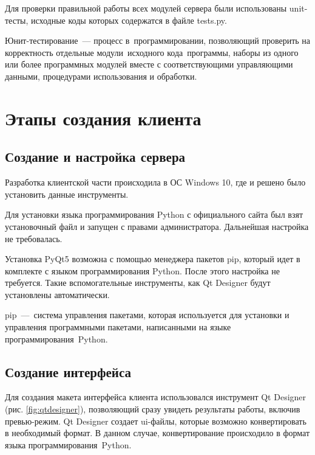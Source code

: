 Для проверки правильной работы всех модулей сервера были использованы unit-тесты, исходные коды которых содержатся в файле tests.py.
\begin{definition}
    Юнит-тестирование --- процесс в программировании, позволяющий проверить на корректность отдельные модули исходного кода программы,
    наборы из одного или более программных модулей вместе с соответствующими управляющими данными, процедурами использования и обработки. 
\end{definition}



\clearpage
\section{Этапы создания клиента}
\subsection{Создание и настройка сервера}
Разработка клиентской части происходила в ОС Windows 10, где и решено было установить данные инструменты.

Для установки языка программирования Python с официального сайта был взят установочный файл и запущен с правами администратора. Дальнейшая настройка не требовалась.

Установка PyQt5 возможна с помощью менеджера пакетов pip, который идет в комплекте с языком программирования Python. После этого настройка не требуется. Такие вспомогательные инструменты, как Qt Designer будут установлены автоматически.

pip --- система управления пакетами, которая используется для установки и управления программными пакетами, написанными на языке программирования Python.


\clearpage
\subsection{Создание интерфейса}
Для создания макета интерфейса клиента использовался инструмент Qt Designer (рис. \ref{fig:qtdesigner}), позволяющий сразу увидеть результаты работы, включив превью-режим. Qt Designer создает ui-файлы, которые возможно конвертировать в необходимый формат. В данном случае, конвертирование происходило в формат языка программирования Python.

